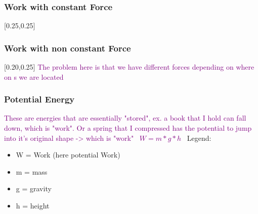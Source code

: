 \documentclass[main.tex,fontsize=8pt,paper=a4,paper=portrait,DIV=calc,]{scrartcl}
\begin{document}
\begin{multicols*}{2}
\subsubsection{Work with constant Force}
[0.25,0.25]

\subsubsection{Work with non constant Force}
[0.20,0.25]\newline
\textcolor{purple}{The problem here is that we have different forces depending on where on s we are located}

\subsubsection{Potential Energy}
\textcolor{purple}{These are energies that are essentially "stored", ex. a book that I hold can fall down, which is "work".\newline
Or a spring that I compressed has the potential to jump into it's original shape -> which is "work"}\newline
\, \newline
\large \textcolor{purple}{\( W = m * g * h \)}\newline
\, \newline
\normalsize Legend: \newline
\begin{itemize}
\item W = Work (here potential Work)
\item m = mass
\item g = gravity 
\item h = height
\end{itemize}


\end{multicols*}
\end{document}
